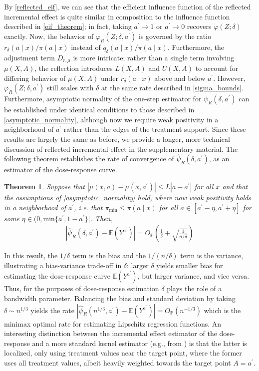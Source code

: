 \documentclass[11pt,twoside]{article}
\newcommand{\E}{\mathbb{E}}
\newtheorem{theorem}{Theorem}
\theoremstyle{definition}
\theoremstyle{remark}
\begin{document}
By \cref{reflected_eif}, we can see that the efficient influence function of the reflected incremental effect is quite similar in composition to the influence function described in \cref{eif_theorem}; in fact, taking $a^\prime \to 1$ or $a^\prime \to 0$ recovers $\varphi(Z; \delta)$ exactly. Now, the behavior of $\varphi_R(Z; \delta, a^\prime)$ is governed by the ratio $r_\delta(a \mid x) / \pi(a \mid x)$ instead of $q_\delta(a \mid x) / \pi(a \mid x)$. Furthermore, the adjustment term $D_{r, \mu}$ is more intricate; rather than a single term involving $\mu(X, A)$, the reflection introduces $L(X, A)$ and $U(X, A)$ to account for differing behavior of $\mu(X, A)$ under $r_\delta(a \mid x)$ above and below $a^\prime$. However, $\varphi_R(Z; \delta, a^\prime)$ still scales with $\delta$ at the same rate described in \cref{sigma_bounds}. Furthermore, asymptotic normality of the one-step estimator for $\psi_R(\delta, a^\prime)$ can be established under identical conditions to those described in \cref{asymptotic_normality}, although now we require weak positivity in a neighborhood of $a^\prime$ rather than the edges of the treatment support. Since these results are largely the same as before, we provide a longer, more technical discussion of reflected incremental effect in the supplementary material. The following theorem establishes the rate of convergence of $\widehat{\psi}_R(\delta, a^\prime)$, as an estimator of the dose-response curve.

\begin{theorem} \label{dose_response_theorem}
    Suppose that $|\mu(x, a) - \mu(x, a^\prime)| \leq L|a - a^\prime|$ for all $x$ and that the assumptions of \cref{asymptotic_normality} hold, where now weak positivity holds in a neighborhood of $a^\prime$, i.e. that $\pi_{\min} \leq \pi(a \mid x)$ for all $a \in  [a^{\prime} - \eta, a^\prime + \eta]$ for some $\eta \in (0, \text{min}\{a^\prime, 1 - a^\prime\}]$. Then,
    \begin{align*}
        \left|\widehat{\psi}_R(\delta, a^\prime) - \E(Y^{a^\prime}) \right| = O_\mathbb{P}\left(\frac{1}{\delta} + \sqrt{\frac{1}{n/\delta}} \right)
    \end{align*}
\end{theorem}

In this result, the $1/\delta$ term is the bias and the $1/(n/\delta)$ term is the variance, illustrating a bias-variance trade-off in $\delta$: larger $\delta$ yields smaller bias for estimating the dose-response curve $\E(Y^{a^\prime})$, but larger variance, and vice versa. Thus, for the purposes of dose-response estimation $\delta$ plays the role of a bandwidth parameter. Balancing the  bias and standard deviation by taking $\delta \sim n^{1/3}$ yields the rate $ |\widehat{\psi}_R(n^{1/3}, a^\prime) - \E(Y^{a^\prime}) | = O_\mathbb{P}(n^{-1/3} )$ which is the minimax optimal rate for estimating Lipschitz regression functions. An interesting distinction between the incremental effect estimator of the dose-response and a more standard kernel estimator (e.g., from \cite{kennedy2017cte}) is that the latter is localized, only using treatment values near the target point, where the former uses all treatment values, albeit heavily weighted towards the target point $A=a^\prime$. 
\end{document}
